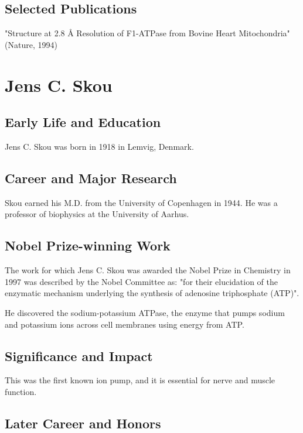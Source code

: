 \subsection*{Selected Publications}

"Structure at 2.8 Å Resolution of F1-ATPase from Bovine Heart Mitochondria" (Nature, 1994)

\clearpage

\section{Jens C. Skou}

\subsection*{Early Life and Education}

Jens C. Skou was born in 1918 in Lemvig, Denmark.

\subsection*{Career and Major Research}

Skou earned his M.D. from the University of Copenhagen in 1944. He was a professor of biophysics at the University of Aarhus.

\subsection*{Nobel Prize-winning Work}

The work for which Jens C. Skou was awarded the Nobel Prize in Chemistry in 1997 was described by the Nobel Committee as: "for their elucidation of the enzymatic mechanism underlying the synthesis of adenosine triphosphate (ATP)".

He discovered the sodium-potassium ATPase, the enzyme that pumps sodium and potassium ions across cell membranes using energy from ATP.

\subsection*{Significance and Impact}

This was the first known ion pump, and it is essential for nerve and muscle function.

\subsection*{Later Career and Honors}

